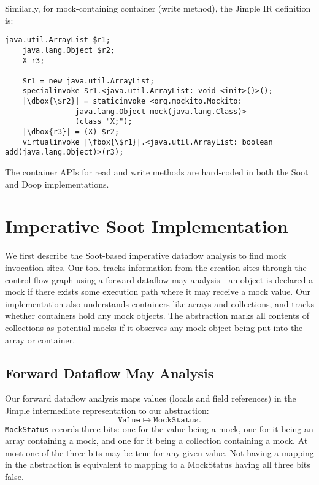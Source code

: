 Similarly, for mock-containing container (write method), the Jimple IR definition is:

\begin{lstlisting}[basicstyle=\linespread{1.0}\ttfamily\small,numbers=none,escapechar={|}]
	java.util.ArrayList $r1;
	java.lang.Object $r2;
	X r3;
	
	$r1 = new java.util.ArrayList;
	specialinvoke $r1.<java.util.ArrayList: void <init>()>();
	|\dbox{\$r2}| = staticinvoke <org.mockito.Mockito: 
				java.lang.Object mock(java.lang.Class)>
				(class "X;");
	|\dbox{r3}| = (X) $r2;
	virtualinvoke |\fbox{\$r1}|.<java.util.ArrayList: boolean add(java.lang.Object)>(r3);
\end{lstlisting}

The container APIs for read and write methods are hard-coded in both the Soot and Doop implementations.

\section{Imperative Soot Implementation}
\label{sec:soot}
We first describe the Soot-based imperative dataflow analysis to find mock invocation sites. Our tool tracks information from the creation sites through the control-flow graph using a forward dataflow may-analysis---an object is declared a mock if there exists some execution path where it may receive a mock value. Our implementation also understands containers like arrays and collections, and tracks whether containers hold any mock objects. The abstraction marks all contents of collections as potential mocks if it observes any mock object being put into the array or container.


\subsection{Forward Dataflow May Analysis}

Our forward dataflow analysis maps values (locals and field references) in the Jimple intermediate representation to our abstraction:
\[ \mathtt{Value} \mapsto \mathtt{MockStatus}. \]
\texttt{MockStatus} records three bits: one for the value being a mock, one for it being an array containing a mock, and one for it being a collection containing a mock. At most one of the three bits may be true for any given value. Not having a mapping in the abstraction is equivalent to mapping to a MockStatus having all three bits false. 

